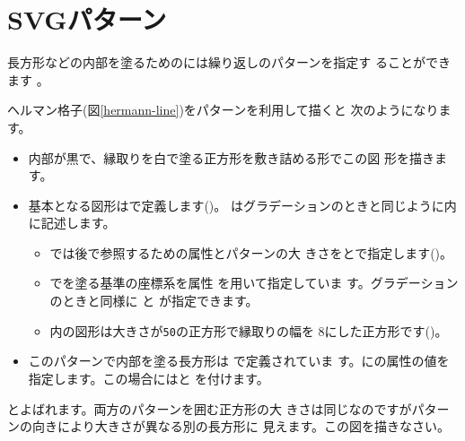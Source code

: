 \section{SVGパターン}
長方形などの内部を塗るためのには繰り返しのパターンを指定す
ることができます
\iffalse\footnote{\FF はSVGパターンをサポートしていません。}\fi 。


ヘルマン格子(図\ref{hermann-line})をパターンを利用して描くと
次のようになります。
{}
\begin{itemize}
 \item 内部が黒で、縁取りを白で塗る正方形を敷き詰める形でこの図
       形を描きます。
 \item 基本となる図形はで定義します()。
        はグラデーションのときと同じように内
	に記述します。
 \begin{itemize}
  \item {}では後で参照するための属性とパターンの大
	きさをとで指定します()。
  \item {}でを塗る基準の座標系を属性
	を用いて指定していま
	す。グラデーションのときと同様に
	と
	が指定できます。
  \item {}内の図形は大きさが\texttt{50}の正方形で縁取りの幅を
	$8$にした正方形です()。
 \end{itemize}
 \item このパターンで内部を塗る長方形は
       で定義されていま
       す。にの属性の値を
       指定します。この場合にはと
       を付けます。
\end{itemize}
{\cite[132ページ]{Ninio}とよばれます。両方のパターンを囲む正方形の大
きさは同じなのですがパターンの向きにより大きさが異なる別の長方形に
見えます。この図を描きなさい。}

